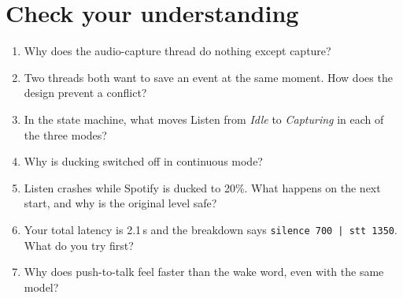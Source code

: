 \documentclass[11pt,a4paper]{article}
\begin{document}
\section{Check your understanding}
\begin{exercise}
\begin{enumerate}
  \item Why does the audio-capture thread do nothing except capture?
  \item Two threads both want to save an event at the same moment. How does the design prevent
        a conflict?
  \item In the state machine, what moves Listen from \emph{Idle} to \emph{Capturing} in each of
        the three modes?
  \item Why is ducking switched off in continuous mode?
  \item Listen crashes while Spotify is ducked to 20\%. What happens on the next start, and why
        is the original level safe?
  \item Your total latency is 2.1\,s and the breakdown says
        \texttt{silence 700 | stt 1350}. What do you try first?
  \item Why does push-to-talk feel faster than the wake word, even with the same model?
\end{enumerate}
\end{exercise}
\end{document}

